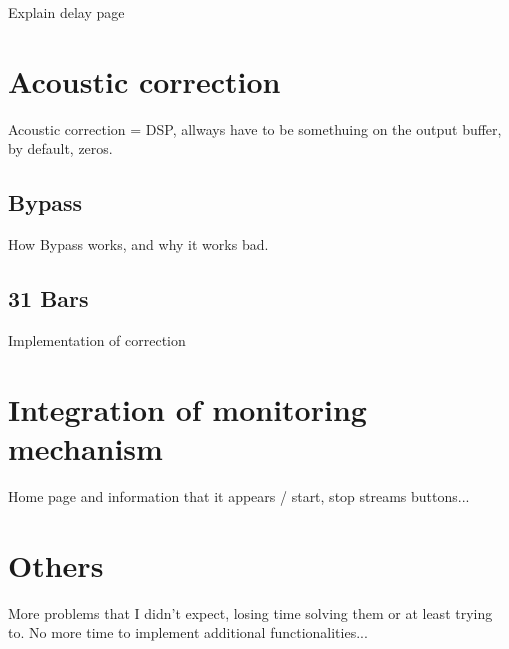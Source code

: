 Explain delay page

\section{Acoustic correction}

Acoustic correction = DSP, allways have to be somethuing on the output buffer, by default, zeros.

\subsection{Bypass}

How Bypass works, and why it works bad.

\subsection{31 Bars}

Implementation of correction

\section{Integration of monitoring mechanism}

Home page and information that it appears / start, stop streams buttons...

\section{Others}

More problems that I didn't expect, losing time solving them or at least trying to. No more time to implement additional functionalities...